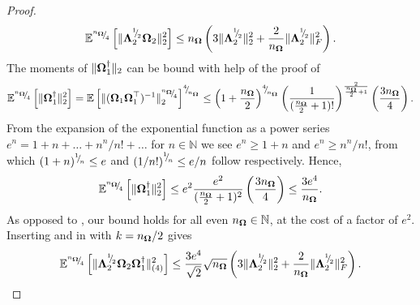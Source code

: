 \begin{proof}
    \begin{equation}
        \mathbb{E}^{{}^{n_{\boldsymbol{\Omega}}}{\mskip -5mu/\mskip -3mu}_{4}}\left[ \lVert \boldsymbol{\Lambda}_2^{{}^{1}{\mskip -5mu/\mskip -3mu}_{2}} \boldsymbol{\Omega}_2 \rVert _2^2 \right]
        \leq n_{\boldsymbol{\Omega}} \left( 3 \lVert \boldsymbol{\Lambda}_2^{{}^{1}{\mskip -5mu/\mskip -3mu}_{2}} \rVert _2^2 + \frac{2}{n_{\boldsymbol{\Omega}}} \lVert \boldsymbol{\Lambda}_2^{{}^{1}{\mskip -5mu/\mskip -3mu}_{2}} \rVert _F^2 \right).
        \label{equ:spectral-norm-bound-applied}
    \end{equation}
    The moments of $\lVert \boldsymbol{\Omega}_1^{\dagger} \rVert _2$ can be bound with help of the proof of \cite[Lemma B.3]{tropp-2023-randomized-algorithms}
    \begin{equation}
        \mathbb{E}^{\sfrac{n_{\mtx{\Omega}}}{4}}\left[ \lVert \mtx{\Omega}_1^{\dagger} \rVert _2^2 \right]
        = \mathbb{E}\left[ \lVert ( \mtx{\Omega}_1 \mtx{\Omega}_1^{\top} )^{-1} \rVert _2^{\sfrac{n_{\mtx{\Omega}}}{4}} \right]^{\sfrac{4}{n_{\mtx{\Omega}}}}%
        \leq \left( 1 + \frac{n_{\mtx{\Omega}}}{2} \right)^{\sfrac{4}{n_{\mtx{\Omega}}}} \left( \frac{1}{(\frac{n_{\mtx{\Omega}}}{2} + 1)!}\right)^{\frac{2}{\frac{n_{\mtx{\Omega}}}{2} + 1}} \left( \frac{3 n_{\mtx{\Omega}}}{4}\right).
    \end{equation}
    From the expansion of the exponential function as a power series $e^n = 1 + n + \dots + n^n/n! + \dots$ for $n \in \mathbb{N}$ we see $e^n \geq 1 + n$ and $e^n \geq n^n / n!$, from which $(1 + n)^{{}^{1}{\mskip -5mu/\mskip -3mu}_{n}} \leq e$ and $\left( 1/n! \right)^{{}^{1}{\mskip -5mu/\mskip -3mu}_{n}} \leq e/n$ follow respectively. Hence,
    \begin{equation}
        \mathbb{E}^{{}^{n_{\boldsymbol{\Omega}}}{\mskip -5mu/\mskip -3mu}_{4}}\left[ \lVert \boldsymbol{\Omega}_1^{\dagger} \rVert _2^2 \right]
        \leq e^2 \frac{e^2}{(\frac{n_{\boldsymbol{\Omega}}}{2}+ 1)^2} \left( \frac{3 n_{\boldsymbol{\Omega}}}{4}\right)
        \leq \frac{3 e^4}{n_{\boldsymbol{\Omega}}}.
        \label{equ:pinv-spectral-norm-bound}
    \end{equation}
    As opposed to \cite[Lemma B.3]{tropp-2023-randomized-algorithms}, our bound holds for all even $n_{\boldsymbol{\Omega}} \in \mathbb{N}$, at the cost of a factor of $e^2$. Inserting  and   in  with $k = n_{\boldsymbol{\Omega}} / 2$ gives
    \begin{equation}
        \mathbb{E}^{\sfrac{n_{\mtx{\Omega}}}{4}}\left[ \lVert \mtx{\Lambda}_2^{\sfrac{1}{2}} \mtx{\Omega}_2 \mtx{\Omega}_1^{\dagger} \rVert _{(4)}^2 \right]
        \leq \frac{3 e^4}{\sqrt{2}}  \sqrt{n_{\mtx{\Omega}}} \left( 3 \lVert \mtx{\Lambda}_2^{\sfrac{1}{2}} \rVert _2^2 + \frac{2}{n_{\mtx{\Omega}}} \lVert \mtx{\Lambda}_2^{\sfrac{1}{2}} \rVert _F^2 \right).

\end{equation}
\end{proof}
